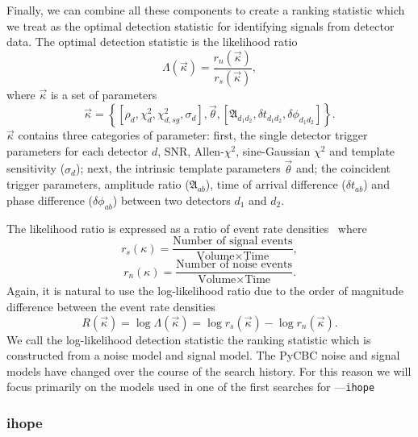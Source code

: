 Finally, we can combine all these components to create a ranking statistic which we treat as the optimal detection statistic for identifying \gwadj signals from \gwadj detector data. The optimal detection statistic is the likelihood ratio~\cite{Biswas:2012}
%
\begin{equation}
    \Lambda(\vec{\kappa}) = \frac{r_{n}(\vec{\kappa})}{r_{s}(\vec{\kappa})},
\end{equation}
%
where $\vec{\kappa}$ is a set of parameters
%
\begin{equation}
    \vec{\kappa} = \left\{ \left[\rho_{d}, \chi^{2}_{d}, \chi^{2}_{d, sg}, \sigma_{d}\right], \vec{\theta}, \left[\mathfrak{A}_{d_{1}d_{2}}, \delta t_{d_{1}d_{2}}, \delta\phi_{d_{1}d_{2}}\right] \right\}.
\end{equation}
%
$\vec{\kappa}$ contains three categories of parameter: first, the single detector trigger parameters for each detector $d$, SNR, Allen-$\chi^{2}$, sine-Gaussian $\chi^{2}$ and template sensitivity ($\sigma_{d}$); next, the intrinsic template parameters $\vec{\theta}$ and; the coincident trigger parameters, amplitude ratio ($\mathfrak{A}_{ab}$), time of arrival difference ($\delta t_{ab}$) and phase difference ($\delta \phi_{ab}$) between two detectors $d_{1}$ and $d_{2}$.

The likelihood ratio is expressed as a ratio of event rate densities~\cite{PyCBC_global:2020} where
%
\begin{equation}
    r_{s}(\kappa) = \frac{\text{Number of signal events}}{\text{Volume} \times \text{Time}},
\end{equation}
%
\begin{equation}
    r_{n}(\kappa) = \frac{\text{Number of noise events}}{\text{Volume} \times \text{Time}}.
\end{equation}
%
Again, it is natural to use the log-likelihood ratio due to the order of magnitude difference between the event rate densities
%
\begin{equation}
    R(\vec{\kappa}) = \log \Lambda(\vec{\kappa}) = \log r_{s}(\vec{\kappa}) - \log r_{n}(\vec{\kappa}).
\end{equation}
%
We call the log-likelihood detection statistic the ranking statistic which is constructed from a noise model and signal model. The PyCBC noise and signal models have changed over the course of the \gwadj search history. For this reason we will focus primarily on the models used in one of the first searches for \cbcs---\texttt{ihope}~\cite{IHOPE:2012zx}

\subsubsection{\label{2:sec:ihope}ihope}

